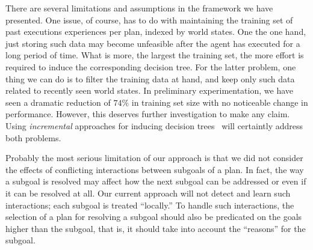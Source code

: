 \bigskip
There are several limitations and assumptions in the framework we have presented.
One issue, of course, has to do with maintaining the training set of past executions experiences per plan, indexed by world states. One the one hand, just storing such data may become unfeasible after the agent has executed for a long period of time. What is more, the largest the training set, the more effort is required to induce the corresponding decision tree. For the latter problem, one thing we can do is to  filter the training data at hand, and keep only such data related to recently seen world states. In preliminary experimentation, we have seen a dramatic reduction of $74\%$ in training set size with no noticeable change in performance. However, this deserves further investigation to make any claim. Using \emph{incremental} approaches for inducing decision trees~\cite{Swere06:Fast,Utgoff:ML89,Utgoff97Decision} will certaintly address both problems.


 Probably the most serious limitation of our approach is that we did not consider the effects of conﬂicting interactions between subgoals of a plan. In fact, the way a subgoal is resolved may affect how the next subgoal can be addressed or even if it can be resolved at all. Our current approach will not detect and learn such interactions; each subgoal is treated ``locally.''
To handle such interactions, the selection of a plan for resolving a subgoal should also be predicated on the goals higher than the subgoal, that is, it should take into account the ``reasons'' for the subgoal. 




